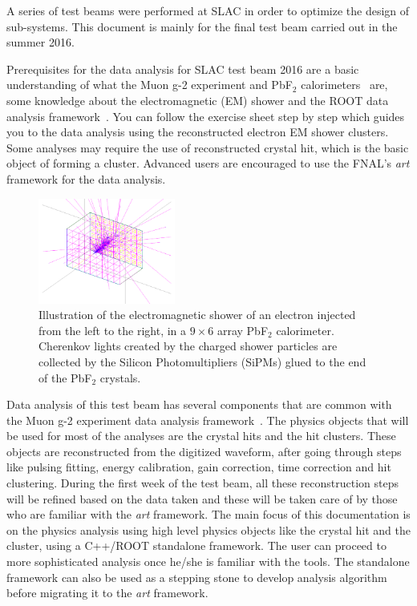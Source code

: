 A series of test beams were performed at SLAC in order to optimize the design of sub-systems. This document is mainly for the final test beam carried out in the summer 2016.

Prerequisites for the data analysis for SLAC test beam 2016 are a basic understanding of what the Muon g-2 experiment and PbF$_2$ calorimeters~\cite{Fienberg2015, Jarek2017} are, some knowledge about the electromagnetic (EM) shower and the ROOT data analysis framework~\cite{ROOT}. You can follow the exercise sheet step by step which guides you to the data analysis using the reconstructed electron EM shower clusters. Some analyses may require the use of reconstructed crystal hit, which is the basic object of forming a cluster. Advanced users are encouraged to use the FNAL's \textit{art} framework for the data analysis.
%
\begin{figure}[htbp]
\centering
\includegraphics[trim=3cm 1cm 3cm 0cm, width=0.4\textwidth]{pics/EMShower.pdf}
\caption{Illustration of the electromagnetic shower of an electron injected from the left to the right, in a $9\times6$ array PbF$_2$ calorimeter. Cherenkov lights created by the charged shower particles are collected by the Silicon Photomultipliers (SiPMs) glued to the end of the PbF$_2$ crystals.}
\end{figure}

Data analysis of this test beam has several components that are common with the Muon g-2 experiment data analysis framework~\cite{Khaw2016}. The physics objects that will be used for most of the analyses are the crystal hits and the hit clusters.
These objects are reconstructed from the digitized waveform, after going through steps like pulsing fitting, energy calibration, gain correction, time correction and hit clustering. During the first week of the test beam, all these reconstruction steps
will be refined based on the data taken and these will be taken care of by those who are familiar with the \textit{art} framework. The main focus of this documentation is on the physics analysis using high level physics objects like the crystal hit and the cluster, using a C++/ROOT standalone framework. The user can proceed to more sophisticated analysis once he/she is familiar with the tools. The standalone framework can also be used as a stepping stone to develop analysis algorithm before migrating it to the \textit{art} framework.

